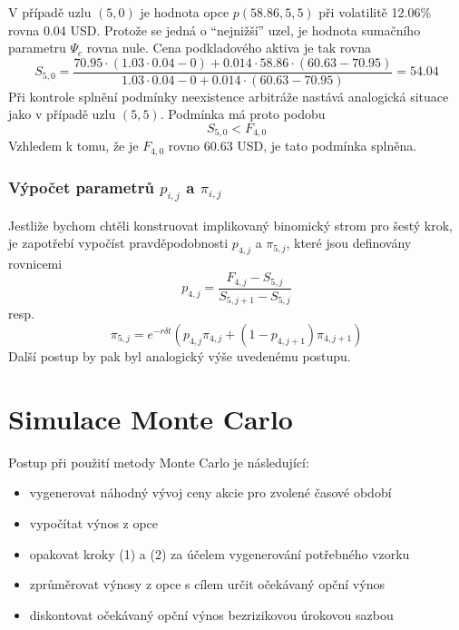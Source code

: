 \documentclass[a4paper]{book}
\begin{document}
V případě uzlu $(5,0)$ je hodnota opce $p(58.86,5,5)$ při volatilitě 12.06\% rovna 0.04 USD. Protože se jedná o ``nejnižší'' uzel, je hodnota sumačního parametru $\Psi_c$ rovna nule. Cena podkladového aktiva je tak rovna
\begin{equation*}
S_{5,0} = \frac{70.95 \cdot (1.03 \cdot 0.04 - 0) + 0.014 \cdot 58.86 \cdot (60.63 - 70.95)}{1.03 \cdot 0.04 - 0 + 0.014 \cdot (60.63 - 70.95)} = 54.04
\end{equation*}
Při kontrole splnění podmínky neexistence arbitráže nastává analogická situace jako v případě uzlu $(5,5)$. Podmínka má proto podobu
\begin{equation*}
S_{5,0} < F_{4,0}
\end{equation*}
Vzhledem k tomu, že je $F_{4,0}$ rovno 60.63 USD, je tato podmínka splněna.

\subsubsection{Výpočet parametrů $p_{i,j}$ a $\pi_{i,j}$}

Jestliže bychom chtěli konstruovat implikovaný binomický strom pro šestý krok, je zapotřebí vypočíst pravděpodobnosti $p_{4,j}$ a $\pi_{5,j}$, které jsou definovány rovnicemi 
\begin{equation*}
p_{4,j} = \frac{F_{4,j} - S_{5,j}}{S_{5,j+1} - S_{5,j}}
\end{equation*}
resp.
\begin{equation*}
\pi_{5,j} = e^{-r \delta t}(p_{4,j}\pi_{4,j} + (1-p_{4,j+1})\pi_{4,j+1})
\end{equation*}
Další postup by pak byl analogický výše uvedenému postupu.

\section{Simulace Monte Carlo}

Postup při použití metody Monte Carlo je následující:
\begin{itemize}
\item vygenerovat náhodný vývoj ceny akcie pro zvolené časové období
\item vypočítat výnos z opce
\item opakovat kroky (1) a (2) za účelem vygenerování potřebného vzorku
\item zprůměrovat výnosy z opce s cílem určit očekávaný opční výnos
\item diskontovat očekávaný opční výnos bezrizikovou úrokovou sazbou
\end{itemize}
\end{document}
